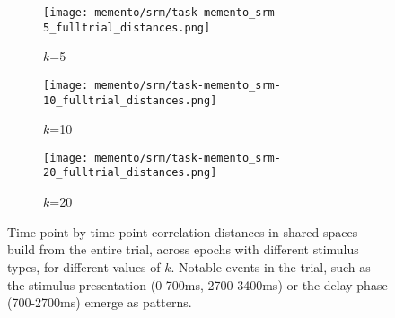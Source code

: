 \begin{figure}
	\centering
	\begin{subfigure}{0.32\textwidth}
		\texttt{[image: memento/srm/task-memento\_srm-5\_fulltrial\_distances.png]}
		\caption{$k$=5}
	\end{subfigure}
	\begin{subfigure}{0.32\textwidth}
		\texttt{[image: memento/srm/task-memento\_srm-10\_fulltrial\_distances.png]}
		\caption{$k$=10}
	\end{subfigure}
	\begin{subfigure}{0.32\textwidth}
		\texttt{[image: memento/srm/task-memento\_srm-20\_fulltrial\_distances.png]}
		\caption{$k$=20}
	\end{subfigure}
	\caption[Time point by time point correlation distances in shared spaces]{Time point by time point correlation distances in shared spaces build from the entire trial, across epochs with different stimulus types, for different values of $k$. Notable events in the trial, such as the stimulus presentation (0-700ms, 2700-3400ms) or the delay phase (700-2700ms) emerge as patterns.}
	\label{fig:srmsharedspacetrial}
\end{figure}




